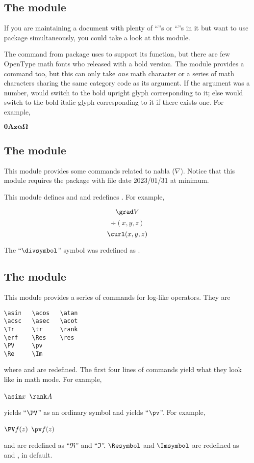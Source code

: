 \documentclass[11pt,letterpaper]{article}
\begin{document}
\subsection{The  module}
If you are maintaining a document with plenty of ``''s or
``''s in it but want to use  package
simultaneously, you could take a look at this module.

The  command from  package uses  to support
its function, but there are few OpenType math fonts who released with a bold
version. The  module provides a  command too, but
this  can only take \emph{one} math character or a series of math
characters sharing the same category code as its argument.
If the argument was a number,  would switch to the bold upright glyph
corresponding to it; else  would switch to the bold italic glyph
corresponding to it if there exists one. For example,
\begin{example}
$\bm{0}\bm{A}\bm{z}
 \bm{\alpha}\bm{\Omega}$
\end{example}

\subsection{The  module}
This module provides some commands related to nabla ($\nabla$). Notice that
this module requires the  package with file date 2023/01/31 at
minimum.

This module defines  and  and redefines . For example,
\begin{example}
\[ \grad V      \]
\[ \div (x,y,z) \]
\[ \curl(x,y,z) \]
\end{example}
The ``$\divsymbol$'' symbol was redefined as .

\subsection{The  module}
This module provides a series of commands for log-like operators. They are
\begin{Verbatim}
\asin   \acos   \atan
\acsc   \asec   \acot
\Tr     \tr     \rank
\erf    \Res    \res
\PV     \pv
\Re     \Im
\end{Verbatim}
where  and  are redefined. The first four lines of commands
yield what they look like in math mode. For example,
\begin{example}
$\asin x$ \quad $\rank A$
\end{example}
 yields ``$\PV$'' as an ordinary symbol and  yields ``$\pv$''.
For example,
\begin{example}
$\PV f(z)$ \quad $\pv f(z)$
\end{example}
 and  are redefined as ``$\Re$'' and ``$\Im$''. $\Resymbol$
and $\Imsymbol$ are redefined as  and , in default.
\end{document}
